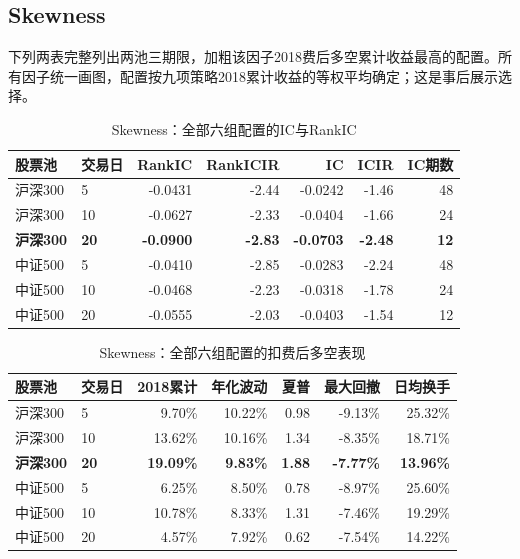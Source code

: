 \subsection{Skewness}
下列两表完整列出两池三期限，加粗该因子2018费后多空累计收益最高的配置。所有因子统一画图，配置按九项策略2018累计收益的等权平均确定；这是事后展示选择。
\begin{table}[H]\centering\normalsize\setlength{\tabcolsep}{3.5pt}
\caption{Skewness：全部六组配置的IC与RankIC}\begin{tabular}{llrrrrr}\toprule
股票池 & 交易日 & RankIC & RankICIR & IC & ICIR & IC期数\\\midrule
沪深300 & 5 & -0.0431 & -2.44 & -0.0242 & -1.46 & 48 \\
沪深300 & 10 & -0.0627 & -2.33 & -0.0404 & -1.66 & 24 \\
\textbf{沪深300} & \textbf{20} & \textbf{-0.0900} & \textbf{-2.83} & \textbf{-0.0703} & \textbf{-2.48} & \textbf{12} \\
中证500 & 5 & -0.0410 & -2.85 & -0.0283 & -2.24 & 48 \\
中证500 & 10 & -0.0468 & -2.23 & -0.0318 & -1.78 & 24 \\
中证500 & 20 & -0.0555 & -2.03 & -0.0403 & -1.54 & 12 \\
\bottomrule\end{tabular}\end{table}
\begin{table}[H]\centering\normalsize\setlength{\tabcolsep}{3.5pt}
\caption{Skewness：全部六组配置的扣费后多空表现}\begin{tabular}{llrrrrr}\toprule
股票池 & 交易日 & 2018累计 & 年化波动 & 夏普 & 最大回撤 & 日均换手\\\midrule
沪深300 & 5 & 9.70\% & 10.22\% & 0.98 & -9.13\% & 25.32\% \\
沪深300 & 10 & 13.62\% & 10.16\% & 1.34 & -8.35\% & 18.71\% \\
\textbf{沪深300} & \textbf{20} & \textbf{19.09\%} & \textbf{9.83\%} & \textbf{1.88} & \textbf{-7.77\%} & \textbf{13.96\%} \\
中证500 & 5 & 6.25\% & 8.50\% & 0.78 & -8.97\% & 25.60\% \\
中证500 & 10 & 10.78\% & 8.33\% & 1.31 & -7.46\% & 19.29\% \\
中证500 & 20 & 4.57\% & 7.92\% & 0.62 & -7.54\% & 14.22\% \\
\bottomrule\end{tabular}\end{table}
\clearpage
{}
\clearpage
